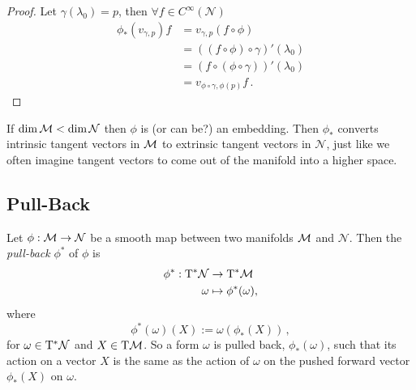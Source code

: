 \begin{proof}
    Let $\gamma(\lambda_0) = p$, then $\forall f\in C^\infty(\mathcal{N})$
    \begin{align}
        \nonumber \phi_*(v_{\gamma,p})f &= v_{\gamma, p}(f\circ \phi)\\
        \nonumber &= \left( (f\circ\phi)\circ\gamma \right)'(\lambda_0)\\
        \nonumber &= \left( f\circ(\phi\circ\gamma) \right)'(\lambda_0)\\
        &= v_{\phi\circ\gamma,\phi(p)}f\,.
    \end{align}
\end{proof}
\begin{note}
    If $\dim\mathcal{M} < \dim\mathcal{N}$ then $\phi$ is (or can be?) an embedding.
    Then $\phi_*$ converts intrinsic tangent vectors in $\mathcal{M}$ to extrinsic
    tangent vectors in $\mathcal{N}$, just like we often imagine tangent vectors
    to come out of the manifold into a higher space.
\end{note}

\subsection{Pull-Back}
\begin{defn}
    Let $\phi: \mathcal{M}\to\mathcal{N}$ be a smooth map between two manifolds
    $\mathcal{M}$ and $\mathcal{N}$.
    Then the \textit{pull-back} $\phi^*$ of $\phi$ is
    \begin{align}
        \phi^*: \T^*\mathcal{N} &\to \T^*\M\\
        \omega &\mapsto \phi^*(\omega),
    \end{align}
    where 
    \begin{equation}
        \phi^*(\omega)(X) := \omega\left( \phi_*(X) \right)\,,
    \end{equation}
    for $\omega\in\T^*\mathcal{N}$ and $X\in\T\M$.
    So a form $\omega$ is pulled back, $\phi_*(\omega)$, such that its action on
    a vector $X$ is the same as the action of $\omega$ on the pushed forward
    vector $\phi_*(X)$ on $\omega$.
    \begin{center}
    \end{center}
\end{defn}
